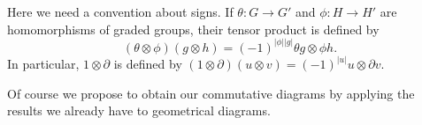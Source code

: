 \documentclass[../main]{subfiles}
\begin{document}
\begin{center}
 {
}
\end{center}

Here we need a convention about signs. If $\theta : G \rightarrow G'$ and $\phi:H \rightarrow H'$ are homomorphisms of graded groups, their tensor product is defined by \[(\theta \otimes \phi)(g \otimes h) = (-1)^{|\phi||g|}\theta g \otimes \phi h.\]  In particular, $1 \otimes \partial$ is defined by $(1 \otimes \partial)(u \otimes v) = (-1)^{|u|}u \otimes \partial v$.

\par Of course we propose to obtain our commutative diagrams by applying the results we already have to geometrical diagrams.
\end{document}
